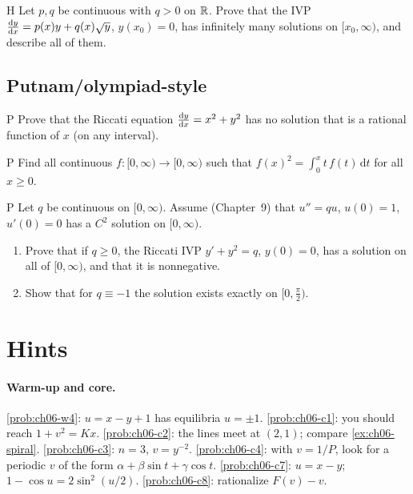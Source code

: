 \begin{problem}{H}\label{prob:ch06-h5}
Let $p, q$ be continuous with $q>0$ on $\mathbb{R}$. Prove that the IVP
$\frac{\mathrm{d}y}{\mathrm{d}x} = p(x)y + q(x)\sqrt{y}$, $y(x_0) = 0$, has infinitely many
solutions on $[x_0,\infty)$, and describe all of them.
\end{problem}

\subsection*{Putnam/olympiad-style}

\begin{problem}{P}\label{prob:ch06-p1}
Prove that the Riccati equation $\frac{\mathrm{d}y}{\mathrm{d}x} = x^2 + y^2$ has no solution that is
a rational function of $x$ (on any interval).
\end{problem}

\begin{problem}{P}\label{prob:ch06-p2}
Find all continuous $f:[0,\infty)\to[0,\infty)$ such that
$\displaystyle f(x)^2 = \int_0^x t\,f(t)\,\mathrm{d}t$ for all $x\ge0$.
\end{problem}

\begin{problem}{P}\label{prob:ch06-p3}
 Let $q$ be continuous on $[0,\infty)$. Assume (Chapter~9) that
$u'' = qu$, $u(0) = 1$, $u'(0) = 0$ has a $C^2$ solution on $[0,\infty)$.
\begin{enumerate}[label=(\alph*)]
  \item Prove that if $q\ge 0$, the Riccati IVP $y' + y^2 = q$, $y(0) = 0$, has a
        solution on all of $[0,\infty)$, and that it is nonnegative.
  \item Show that for $q\equiv -1$ the solution exists exactly on
        $[0,\frac\pi2)$.
\end{enumerate}
\end{problem}

\section{Hints}\label{sec:ch06-hints}


\paragraph{Warm-up and core.}
\cref{prob:ch06-w4}: $u = x - y + 1$ has equilibria $u = \pm1$.
\cref{prob:ch06-c1}: you should reach $1 + v^2 = Kx$.
\cref{prob:ch06-c2}: the lines meet at $(2,1)$; compare \cref{ex:ch06-spiral}.
\cref{prob:ch06-c3}: $n = 3$, $v = y^{-2}$.
\cref{prob:ch06-c4}: with $v = 1/P$, look for a periodic $v$ of the form
$\alpha + \beta\sin t + \gamma\cos t$.
\cref{prob:ch06-c7}: $u = x - y$; $1 - \cos u = 2\sin^2(u/2)$.
\cref{prob:ch06-c8}: rationalize $F(v) - v$.


